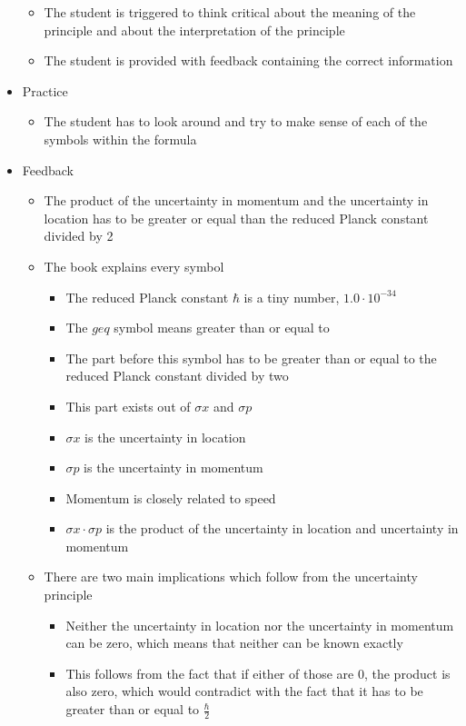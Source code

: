 \documentclass[11pt,twoside]{report} %
\begin{document}
\begin{itemize}
\begin{itemize}
		\item The student is triggered to think critical about the meaning of the principle and about the interpretation of the principle
		\item The student is provided with feedback containing the correct information
	\end{itemize}
	\item Practice
	\begin{itemize}
		\item The student has to look around and try to make sense of each of the symbols within the formula
	\end{itemize}
	\item Feedback
	\begin{itemize}
		\item The product of the uncertainty in momentum and the uncertainty in location has to be greater or equal than the reduced Planck constant divided by 2
		\item The book explains every symbol
		\begin{itemize}
			\item The reduced Planck constant $\hbar$ is a tiny number, $1.0 \cdot 10^{-34}$
			\item The $geq$ symbol means greater than or equal to
			\item The part before this symbol has to be greater than or equal to the reduced Planck constant divided by two
			\item This part exists out of $\sigma x$ and $\sigma p$
			\item $\sigma x$ is the uncertainty in location
			\item $\sigma p$ is the uncertainty in momentum
			\item Momentum is closely related to speed
			\item $\sigma x \cdot \sigma p$ is the product of the uncertainty in location and uncertainty in momentum
		\end{itemize}
		\item There are two main implications which follow from the uncertainty principle
		\begin{itemize}
			\item Neither the uncertainty in location nor the uncertainty in momentum can be zero, which means that neither can be known exactly
			\item This follows from the fact that if either of those are 0, the product is also zero, which would contradict with the fact that it has to be greater than or equal to $\frac{\hbar}{2}$

\end{itemize}
\end{itemize}
\end{itemize}
\end{document}
